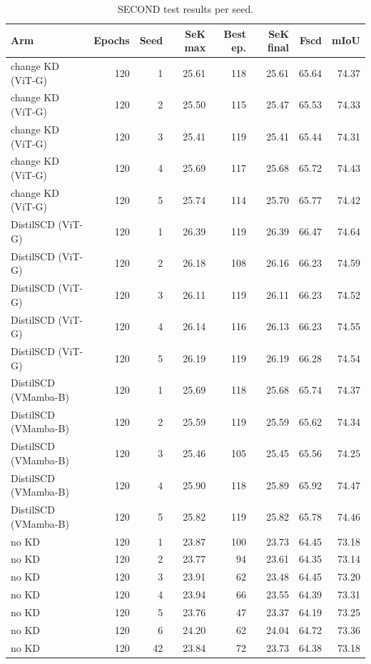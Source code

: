 \begin{table}[!t]
\centering
\footnotesize
\caption{SECOND test results per seed.}
\label{tab:s-second-runs}
\begin{tabular}{lrrrrrrr}
\toprule
Arm & Epochs & Seed & SeK max & Best ep. & SeK final & Fscd & mIoU \\
\midrule
change KD (ViT-G) & 120 & 1 & 25.61 & 118 & 25.61 & 65.64 & 74.37 \\
change KD (ViT-G) & 120 & 2 & 25.50 & 115 & 25.47 & 65.53 & 74.33 \\
change KD (ViT-G) & 120 & 3 & 25.41 & 119 & 25.41 & 65.44 & 74.31 \\
change KD (ViT-G) & 120 & 4 & 25.69 & 117 & 25.68 & 65.72 & 74.43 \\
change KD (ViT-G) & 120 & 5 & 25.74 & 114 & 25.70 & 65.77 & 74.42 \\
DistilSCD (ViT-G) & 120 & 1 & 26.39 & 119 & 26.39 & 66.47 & 74.64 \\
DistilSCD (ViT-G) & 120 & 2 & 26.18 & 108 & 26.16 & 66.23 & 74.59 \\
DistilSCD (ViT-G) & 120 & 3 & 26.11 & 119 & 26.11 & 66.23 & 74.52 \\
DistilSCD (ViT-G) & 120 & 4 & 26.14 & 116 & 26.13 & 66.23 & 74.55 \\
DistilSCD (ViT-G) & 120 & 5 & 26.19 & 119 & 26.19 & 66.28 & 74.54 \\
DistilSCD (VMamba-B) & 120 & 1 & 25.69 & 118 & 25.68 & 65.74 & 74.37 \\
DistilSCD (VMamba-B) & 120 & 2 & 25.59 & 119 & 25.59 & 65.62 & 74.34 \\
DistilSCD (VMamba-B) & 120 & 3 & 25.46 & 105 & 25.45 & 65.56 & 74.25 \\
DistilSCD (VMamba-B) & 120 & 4 & 25.90 & 118 & 25.89 & 65.92 & 74.47 \\
DistilSCD (VMamba-B) & 120 & 5 & 25.82 & 119 & 25.82 & 65.78 & 74.46 \\
no KD & 120 & 1 & 23.87 & 100 & 23.73 & 64.45 & 73.18 \\
no KD & 120 & 2 & 23.77 & 94 & 23.61 & 64.35 & 73.14 \\
no KD & 120 & 3 & 23.91 & 62 & 23.48 & 64.45 & 73.20 \\
no KD & 120 & 4 & 23.94 & 66 & 23.55 & 64.39 & 73.31 \\
no KD & 120 & 5 & 23.76 & 47 & 23.37 & 64.19 & 73.25 \\
no KD & 120 & 6 & 24.20 & 62 & 24.04 & 64.72 & 73.36 \\
no KD & 120 & 42 & 23.84 & 72 & 23.73 & 64.38 & 73.18 \\

\end{tabular}
\end{table}
